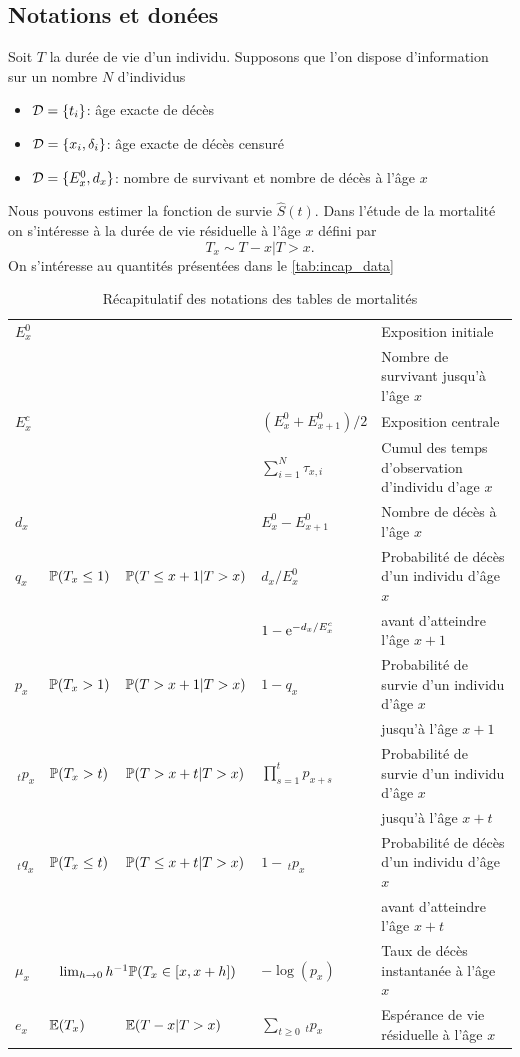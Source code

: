 \subsection{Notations et donées}\label{sssec:notation}
Soit $T$ la durée de vie d'un individu. Supposons que l'on dispose d'information sur un nombre $N$ d'individus
\begin{itemize}
  \item $\mathcal{D} = \{t_i\}$: âge exacte de décès
  \item $\mathcal{D} =\{x_i, \delta_i\}$: âge exacte de décès censuré
  \item $\mathcal{D} = \{E^0_x,d_x\}$: nombre de survivant et nombre de décès à l'âge $x$
\end{itemize}
Nous pouvons estimer la fonction de survie $\widehat{S}(t)$. Dans l'étude de la mortalité on s'intéresse à la durée de vie résiduelle à l'âge $x$ défini par 
$$
T_x\sim T-x|T>x.
$$
On s'intéresse au quantités présentées dans le \cref{tab:incap_data}
\begin{table}[ht!]\centering
\begin{tabular}{@{}lllll@{}}
\toprule
$E_x^0$&&&&Exposition initiale\\
&&&&Nombre de survivant jusqu'à l'âge $x$\\
\midrule
$E_x^c$&&&$(E_x^0 + E_{x+1}^0)/2 $&Exposition centrale\\

&&&$\sum_{i=1}^N\tau_{x,i}$&Cumul des temps d'observation d'individu d'age $x$\\
\midrule

$d_x$&&&$E^0_{x} - E^0_{x+1}$&Nombre de décès à l'âge $x$\\
\midrule
$q_x$&$\mathbb{P}(T_x \leq 1)$&$\mathbb{P}(T \leq x+1|T> x)$&$d_x/E^0_x$& Probabilité de décès d'un individu d'âge $x$ \\
&&&$1-\mathrm{e}^{-d_x/E_x^c}$&avant d'atteindre l'âge $x+1$\\
\midrule
$p_x$&$\mathbb{P}(T_x > 1)$&$\mathbb{P}(T > x+1|T> x)$&$1-q_x$ &Probabilité de survie d'un individu d'âge $x$ \\
&&&&jusqu'à l'âge $x+1$\\
\midrule
$\,_tp_x$&$\mathbb{P}(T_x > t)$&$\mathbb{P}(T > x+t|T> x)$&$\prod_{s=1}^tp_{x+s}$& Probabilité de survie d'un individu d'âge $x$ \\
&&&&jusqu'à l'âge $x+t$\\
\midrule
$\,_tq_x$&$\mathbb{P}(T_x \leq t)$&$\mathbb{P}(T \leq x+t|T> x)$&$1 - \,_tp_x$& Probabilité de décès d'un individu d'âge $x$ \\
&&&&avant d'atteindre l'âge $x+t$\\
\midrule

$\mu_x$&\multicolumn{2}{c}{$\lim_{h\rightarrow 0}h^{-1}\mathbb{P}(T_x\in[x,x+h])$}&$-\log(p_x)$ &Taux de décès instantanée à l'âge $x$\\
\midrule
$e_x$&$\mathbb{E}(T_x)$&$\mathbb{E}(T-x|T>x)$&$\sum_{t\geq 0} \,_tp_x$ &Espérance de vie résiduelle à l'âge $x$\\
\bottomrule
\end{tabular}
\caption{Récapitulatif des notations des tables de mortalités}
\label{tab:notation_mortality_table}
\end{table}
